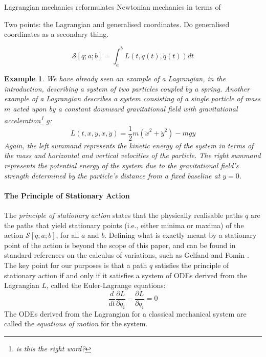 \documentclass[preprint]{sigplanconf}
\theoremstyle{examplestyle}
\newtheorem{example}{Example}
\begin{document}
Lagrangian mechanics reformulates Newtonian mechanics in terms of 

Two points: the Lagrangian and generalised coordinates. Do
generalised coordinates as a secondary thing.

\begin{displaymath}
  \mathcal{S}[q;a;b] = \int_a^b L(t,q(t),\dot{q}(t)) \mathit{dt}
\end{displaymath}

\begin{example}
  We have already seen an example of a Lagrangian, in the
  introduction, describing a system of two particles coupled by a
  spring. Another example of a Lagrangian describes a system
  consisting of a single particle of mass $m$ acted upon by a constant
  downward gravitational field with gravitational acceleration\footnote{is this the right word?} $g$:
  \begin{equation}\label{eq:simple-g-lagrangian}
    L(t,x,y,\dot{x},\dot{y}) = \frac{1}{2}m(\dot{x}^2 + \dot{y}^2) - mgy
  \end{equation}
  Again, the left summand represents the kinetic energy of the system
  in terms of the mass and horizontal and vertical velocities of the
  particle. The right summand represents the potential energy of the
  system due to the gravitational field's strength determined by the
  particle's distance from a fixed baseline at $y = 0$.
\end{example}

\paragraph{The Principle of Stationary Action}

The \emph{principle of stationary action} states that the physically
realisable paths $q$ are the paths that yield stationary points (i.e.,
either minima or maxima) of the action $\mathcal{S}[q;a;b]$, for all
$a$ and $b$. Defining what is exactly meant by a stationary point of
the action is beyond the scope of this paper, and can be found in
standard references on the calculus of variations, such as Gelfand and
Fomin \cite{gelfandXXcalculus}. The key point for our purposes is that
a path $q$ satisfies the principle of stationary action if and only if
it satisfies a system of ODEs derived from the Lagrangian $L$, called
the Euler-Lagrange equations:
\begin{equation}\label{eq:euler-lagrange}
  \frac{d}{dt}\frac{\partial L}{\partial \dot{q_i}} - \frac{\partial L}{\partial q_i} = 0
\end{equation}
The ODEs derived from the Lagrangian for a classical mechanical system
are called the \emph{equations of motion} for the system.
\end{document}
